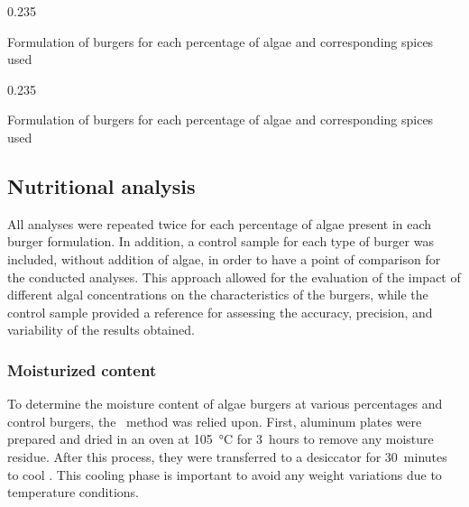 \begin{table}[H]
\footnotesize
\centering
	\begin{subcaptionblock}{0.68\textwidth}
	\centering
	\end{subcaptionblock}%
\hspace*{\hbtwsfig}%
	\begin{subcaptionblock}[][16.355em][c]{0.235\textwidth}
	\centering
	\end{subcaptionblock}%
\caption{Formulation of  burgers for each percentage of algae and corresponding spices used}
\label{tab:formulation_spices-chlorella}
\end{table}

\begin{table}[H]
\footnotesize
\centering
	\begin{subcaptionblock}{0.5\textwidth}
	\centering
	\end{subcaptionblock}%
\hspace*{\hbtwsfig}%
	\begin{subcaptionblock}[][15.95em][c]{0.235\textwidth}
	\centering
	\end{subcaptionblock}%
\caption{Formulation of  burgers for each percentage of algae and corresponding spices used}
\label{tab:formulation_spices-palmaria}
\end{table}
	
\subsection{Nutritional analysis}
All analyses were repeated twice for each percentage of algae present in each burger formulation. In addition, a control sample for each type of burger was included, without addition of algae, in order to have a point of comparison for the conducted analyses. This approach allowed for the evaluation of the impact of different algal concentrations on the characteristics of the burgers, while the control sample provided a reference for assessing the accuracy, precision, and variability of the results obtained.


\subsubsection{Moisturized content}
To determine the moisture content of algae burgers at various percentages and control burgers, the~\cite{aoac_2000}\zxriv{} method was relied upon. First, aluminum plates were prepared and dried in an oven at \qty{105}{\degreeCelsius} for \qty{3}{hours} to remove any moisture residue. After this process, they were transferred to a desiccator for \qty{30}{minutes} to cool . This cooling phase is important to avoid any weight variations due to temperature conditions.

